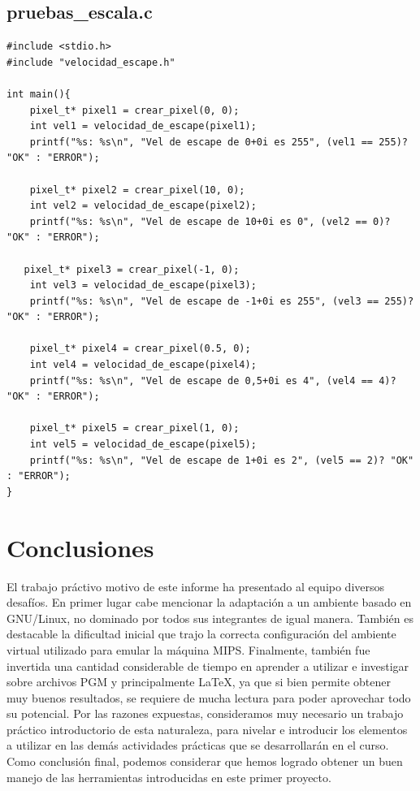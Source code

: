 \documentclass[a4paper,10pt]{article}
\begin{document}
\subsection{pruebas_escala.c}
\begin{verbatim}
#include <stdio.h>
#include "velocidad_escape.h"

int main(){
	pixel_t* pixel1 = crear_pixel(0, 0);
	int vel1 = velocidad_de_escape(pixel1);
	printf("%s: %s\n", "Vel de escape de 0+0i es 255", (vel1 == 255)? "OK" : "ERROR");

	pixel_t* pixel2 = crear_pixel(10, 0);
	int vel2 = velocidad_de_escape(pixel2);
	printf("%s: %s\n", "Vel de escape de 10+0i es 0", (vel2 == 0)? "OK" : "ERROR");
	
   pixel_t* pixel3 = crear_pixel(-1, 0);
	int vel3 = velocidad_de_escape(pixel3);
	printf("%s: %s\n", "Vel de escape de -1+0i es 255", (vel3 == 255)? "OK" : "ERROR");
	
	pixel_t* pixel4 = crear_pixel(0.5, 0);
	int vel4 = velocidad_de_escape(pixel4);
	printf("%s: %s\n", "Vel de escape de 0,5+0i es 4", (vel4 == 4)? "OK" : "ERROR");
	
	pixel_t* pixel5 = crear_pixel(1, 0);
	int vel5 = velocidad_de_escape(pixel5);
	printf("%s: %s\n", "Vel de escape de 1+0i es 2", (vel5 == 2)? "OK" : "ERROR");
}

\end{verbatim}

\pagebreak



\section{Conclusiones}
El trabajo pr\'activo motivo de este informe ha presentado al equipo diversos desaf\'ios. En primer lugar cabe mencionar la adaptaci\'on a un ambiente basado en GNU/Linux, no dominado por todos sus integrantes de igual manera. Tambi\'en es destacable la dificultad inicial que trajo la correcta configuraci\'on del ambiente virtual utilizado para emular la m\'aquina MIPS. Finalmente, tambi\'en fue invertida una cantidad considerable de tiempo en aprender a utilizar e investigar sobre archivos PGM y principalmente \LaTeX{}, ya que si bien permite obtener muy buenos resultados, se requiere de mucha lectura para poder aprovechar todo su potencial.
Por las razones expuestas, consideramos muy necesario un trabajo pr\'actico introductorio de esta naturaleza, para nivelar e introducir los elementos a utilizar en las dem\'as actividades pr\'acticas que se desarrollar\'an en el curso.\\
Como conclusi\'on final, podemos considerar que hemos logrado obtener un buen manejo de las herramientas introducidas en este primer proyecto.
\end{document}
